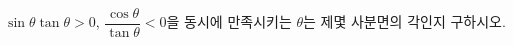 $\sin\theta\tan\theta>0$, $\dfrac{\cos\theta}{\tan\theta}<0$을 동시에 만족시키는 $\theta$는 제몇 사분면의 각인지 구하시오.
